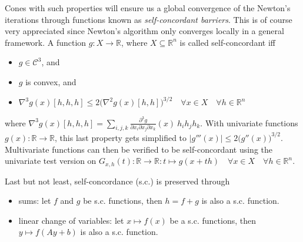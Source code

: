\documentclass[11 pt]{report}
\begin{document}
Cones with such properties will ensure us a global convergence of the Newton's iterations through functions known as \textit{self-concordant barriers}. This is of course very appreciated since Newton's algorithm only converges locally in a general framework.
A function $g:X\to\mathbb{R}$, where $X\subseteq \mathbb{R}^n$ is called self-concordant iff
\begin{itemize}[label=--]
    \item $g \in \mathcal{C}^3$, and
    \item $g$ is convex, and
    \item $\nabla^3 g(x) [h, h, h] \leq 2 \big(\nabla^2 g(x) [h, h]\big)^{3/2} \quad \forall x \in X \quad \forall h \in \mathbb{R}^n$
\end{itemize}
where $\nabla^3 g(x) [h, h, h] = \sum_{i, j, k} \frac{\partial^3 g}{\partial x_i \partial x_j \partial x_k}(x)\: h_i h_j h_k$. With univariate functions $g(x) : \mathbb{R} \to \mathbb{R}$, this last property gets simplified to $|g'''(x)| \leq 2 \big( g''(x) \big)^{3/2}$. Multivariate functions can then be verified to be self-concordant using the univariate test version on $G_{x,h}(t) : \mathbb{R} \to \mathbb{R} : t \mapsto g(x + th) \quad \forall x \in X \quad \forall h \in \mathbb{R}^n$.

Last but not least, self-concordance (s.c.) is preserved through
\begin{itemize}[label=--]
    \item sums: let $f$ and $g$ be s.c. functions, then $h = f+g$ is also a s.c. function.
    \item linear change of variables: let $x \mapsto f(x)$ be a s.c. functions, then $y \mapsto f(A y + b)$ is also a s.c. function.
\end{itemize}
\end{document}
